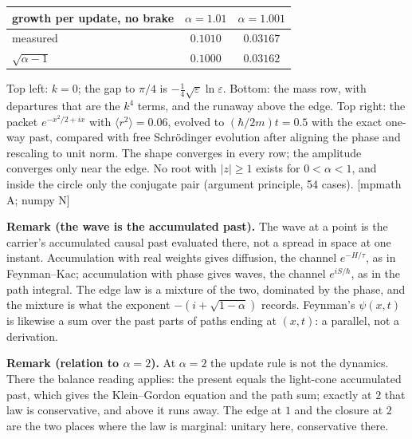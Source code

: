 \documentclass[10pt]{article}
\newcommand{\eps}{\varepsilon}
\newcommand{\tg}[1]{{\scriptsize[#1]}}
\begin{document}
\begin{smallbox}
{\begin{tabular}[t]{@{}l c c@{}}
\toprule
growth per update, no brake & $\alpha=1.01$ & $\alpha=1.001$\\
\midrule
measured & $0.1010$ & $0.03167$\\
$\sqrt{\alpha-1}$ & $0.1000$ & $0.03162$\\
\bottomrule
\end{tabular}}\par\vspace{2pt}
Top left: $k=0$; the gap to $\pi/4$ is $-\tfrac14\sqrt\eps\ln\eps$. Bottom: the mass row, with departures that are the $k^4$ terms, and the runaway above the edge. Top right: the packet $e^{-x^2/2+ix}$ with $\langle r^2\rangle=0.06$, evolved to $(\hbar/2m)t=0.5$ with the exact one-way past, compared with free Schr\"odinger evolution after aligning the phase and rescaling to unit norm. The shape converges in every row; the amplitude converges only near the edge. No root with $|z|\ge1$ exists for $0<\alpha<1$, and inside the circle only the conjugate pair (argument principle, 54 cases). \tg{mpmath A; numpy N}
\end{smallbox}

\vspace{1pt}
\begin{smallbox}
\textbf{Remark (the wave is the accumulated past).} The wave at a point is the carrier's accumulated causal past evaluated there, not a spread in space at one instant. Accumulation with real weights gives diffusion, the channel $e^{-H/\tau}$, as in Feynman--Kac; accumulation with phase gives waves, the channel $e^{iS/\hbar}$, as in the path integral. The edge law is a mixture of the two, dominated by the phase, and the mixture is what the exponent $-(i+\sqrt{1-\alpha})$ records. Feynman's $\psi(x,t)$ is likewise a sum over the past parts of paths ending at $(x,t)$: a parallel, not a derivation.\par\vspace{1pt}
\textbf{Remark (relation to $\alpha=2$).} At $\alpha=2$ the update rule is not the dynamics. There the balance reading applies: the present equals the light-cone accumulated past, which gives the Klein--Gordon equation and the path sum; exactly at $2$ that law is conservative, and above it runs away. The edge at $1$ and the closure at $2$ are the two places where the law is marginal: unitary here, conservative there.
\end{smallbox}
\end{document}
